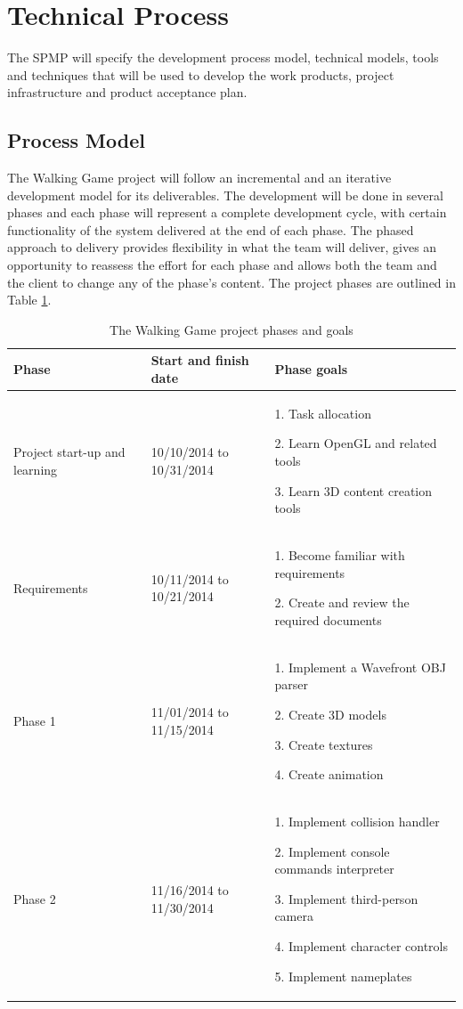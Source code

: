 \documentclass[12pt,letterpaper]{article}
\begin{document}
	\clearpage
	\bigskip
	
	\section{Technical Process}
	The SPMP will specify the development process model, technical models, tools and techniques that will be used to develop the work products, project infrastructure and product acceptance plan.
	
	\subsection{Process Model}
	The Walking Game project will follow an incremental and an iterative development model for its deliverables. The development will be done in several phases and each phase will represent a complete development cycle, with certain functionality of the system delivered at the end of each phase. The phased approach to delivery provides flexibility in what the team will deliver, gives an opportunity to reassess the effort for each phase and allows both the team and the client to change any of the phase's content. The project phases are outlined in Table \ref{tab:t4}.
	
	\begin{flushleft}
		\begin{table}[h]
			\begin{tabular}{|p{1.23in}|p{1.233in}|p{3.49in}|}
				\hline
				Phase & Start and finish date & Phase goals \\\hline
				Project start-up and learning &	10/10/2014 to 10/31/2014 &
				1. Task allocation
				\par
				2. Learn OpenGL and related tools
				\par
				3. Learn 3D content creation tools \\\hline
				Requirements &
				10/11/2014 to 10/21/2014 &
				1. Become familiar with requirements
				\par
				2. Create and review the required documents \\\hline
				Phase 1 &
				11/01/2014 to 11/15/2014 &
				1. Implement a Wavefront OBJ parser
				\par
				2. Create 3D models
				\par
				3. Create textures
				\par
				4. Create animation \\\hline
				Phase 2 &
				11/16/2014 to 11/30/2014 &
				1. Implement collision handler
				\par
				2. Implement console commands interpreter
				\par
				3. Implement third-person camera
				\par
				4. Implement character controls
				\par
				5. Implement nameplates \\\hline
			\end{tabular}
			\caption{The Walking Game project phases and goals}
			\label{tab:t4}
		\end{table}
	\end{flushleft}
	
\end{document}
